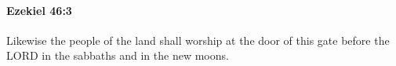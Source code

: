 
		\paragraph{Ezekiel 46:3} %
			\label{EZEKIEL-46-3}

			Likewise the people of the land shall worship at the door of this gate before the LORD in the sabbaths and in the new moons.


